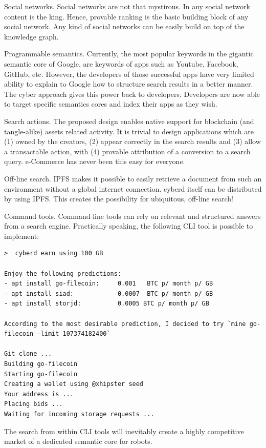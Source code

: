 \documentclass[8pt,oneside]{amsart}
\newcommand{\code}[1]{{\PlayBold #1}}
\begin{document}
\code{Social networks}. Social networks are not that mystirous. In any social network content is the king. Hence, provable ranking is the basic building block of any social network. Any kind of social networks can be easily build on top of the knowledge graph.

\code{Programmable semantics}. Currently, the most popular keywords in the gigantic semantic core of Google, are keywords of apps such as Youtube, Facebook, GitHub, etc. However, the developers of those successful apps have very limited ability to explain to Google how to structure search results in a better manner. The cyber approach gives this power back to developers. Developers are now able to target specific semantics cores and index their apps as they wish.

\code{Search actions}. The proposed design enables native support for blockchain (and tangle-alike) assets related activity. It is trivial to design applications which are (1) owned by the creators, (2) appear correctly in the search results and (3) allow a transactable action, with (4) provable attribution of a conversion to a search query. e-Commerce has never been this easy for everyone.

\code{Off-line search}. IPFS makes it possible to easily retrieve a document from such an environment without a global internet connection. cyberd itself can be distributed by using IPFS. This creates the possibility for ubiquitous, off-line search!

\code{Command tools}. Command-line tools can rely on relevant and structured answers from a search engine. Practically speaking, the following CLI tool is possible to implement:

\begin{lstlisting}
>  cyberd earn using 100 GB

Enjoy the following predictions:
- apt install go-filecoin:     0.001   BTC p/ month p/ GB
- apt install siad:            0.0007  BTC p/ month p/ GB
- apt install storjd:          0.0005 BTC p/ month p/ GB

According to the most desirable prediction, I decided to try `mine go-filecoin -limit 107374182400`

Git clone ...
Building go-filecoin
Starting go-filecoin
Creating a wallet using @xhipster seed
Your address is ...
Placing bids ...
Waiting for incoming storage requests ...

\end{lstlisting}

The search from within CLI tools will inevitably create a highly competitive market of a dedicated semantic core for robots.
\end{document}
